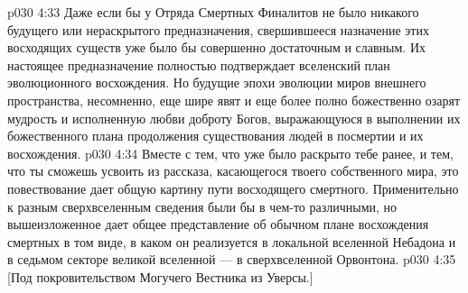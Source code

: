 \vs p030 4:33 Даже если бы у Отряда Смертных Финалитов не было никакого будущего или нераскрытого предназначения, свершившееся назначение этих восходящих существ уже было бы совершенно достаточным и славным. Их настоящее предназначение полностью подтверждает вселенский план эволюционного восхождения. Но будущие эпохи эволюции миров внешнего пространства, несомненно, еще шире явят и еще более полно божественно озарят мудрость и исполненную любви доброту Богов, выражающуюся в выполнении их божественного плана продолжения существования людей в посмертии и их восхождения.
\vs p030 4:34 \pc Вместе с тем, что уже было раскрыто тебе ранее, и тем, что ты сможешь усвоить из рассказа, касающегося твоего собственного мира, это повествование дает общую картину пути восходящего смертного. Применительно к разным сверхвселенным сведения были бы в чем\hyp{}то различными, но вышеизложенное дает общее представление об обычном плане восхождения смертных в том виде, в каком он реализуется в локальной вселенной Небадона и в седьмом секторе великой вселенной --- в сверхвселенной Орвонтона.
\vsetoff
\vs p030 4:35 [Под покровительством Могучего Вестника из Уверсы.]

